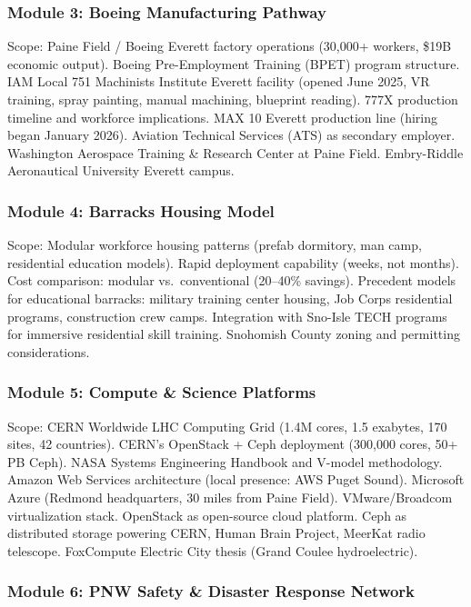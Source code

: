 \documentclass[11pt,letterpaper]{article}
\begin{document}
\subsubsection{Module 3: Boeing Manufacturing Pathway}

Scope: Paine Field / Boeing Everett factory operations (30,000+ workers, \$19B economic output). Boeing Pre-Employment Training (BPET) program structure. IAM Local 751 Machinists Institute Everett facility (opened June 2025, VR training, spray painting, manual machining, blueprint reading). 777X production timeline and workforce implications. MAX 10 Everett production line (hiring began January 2026). Aviation Technical Services (ATS) as secondary employer. Washington Aerospace Training \& Research Center at Paine Field. Embry-Riddle Aeronautical University Everett campus.

\subsubsection{Module 4: Barracks Housing Model}

Scope: Modular workforce housing patterns (prefab dormitory, man camp, residential education models). Rapid deployment capability (weeks, not months). Cost comparison: modular vs.\ conventional (20--40\% savings). Precedent models for educational barracks: military training center housing, Job Corps residential programs, construction crew camps. Integration with Sno-Isle TECH programs for immersive residential skill training. Snohomish County zoning and permitting considerations.

\subsubsection{Module 5: Compute \& Science Platforms}

Scope: CERN Worldwide LHC Computing Grid (1.4M cores, 1.5 exabytes, 170 sites, 42 countries). CERN's OpenStack + Ceph deployment (300,000 cores, 50+ PB Ceph). NASA Systems Engineering Handbook and V-model methodology. Amazon Web Services architecture (local presence: AWS Puget Sound). Microsoft Azure (Redmond headquarters, 30 miles from Paine Field). VMware/Broadcom virtualization stack. OpenStack as open-source cloud platform. Ceph as distributed storage powering CERN, Human Brain Project, MeerKat radio telescope. FoxCompute Electric City thesis (Grand Coulee hydroelectric).

\subsubsection{Module 6: PNW Safety \& Disaster Response Network}
\end{document}

